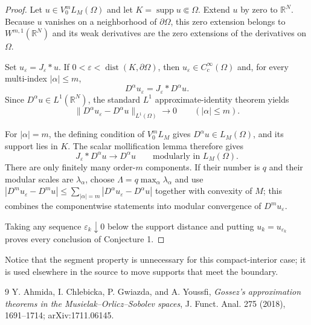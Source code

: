 \documentclass[11pt]{article}
\newcommand{\R}{\mathbb R}
\begin{document}
\begin{proof}
Let $u\in V_0^mL_M(\Omega)$ and let $K=\operatorname{supp}u\Subset\Omega$.
Extend $u$ by zero to $\R^N$.  Because $u$ vanishes on a neighborhood of
$\partial\Omega$, this zero extension belongs to $W^{m,1}(\R^N)$ and its weak
derivatives are the zero extensions of the derivatives on $\Omega$.

Set $u_\varepsilon=J_\varepsilon*u$.  If
$0<\varepsilon<\operatorname{dist}(K,\partial\Omega)$, then
$u_\varepsilon\in C_c^\infty(\Omega)$ and, for every multi-index
$|\alpha|\le m$,
\[
 D^\alpha u_\varepsilon=J_\varepsilon*D^\alpha u.
\]
Since $D^\alpha u\in L^1(\R^N)$, the standard $L^1$ approximate-identity
theorem yields
\[
 \|D^\alpha u_\varepsilon-D^\alpha u\|_{L^1(\Omega)}\longrightarrow0
 \qquad (|\alpha|\le m).
\]

For $|\alpha|=m$, the defining condition of $V_0^mL_M$ gives
$D^\alpha u\in L_M(\Omega)$, and its support lies in $K$.  The scalar
mollification lemma therefore gives
\[
 J_\varepsilon*D^\alpha u\longrightarrow D^\alpha u
 \qquad\text{modularly in }L_M(\Omega).
\]
There are only finitely many order-$m$ components.  If their number is $q$ and
their modular scales are $\lambda_\alpha$, choose
$\Lambda=q\max_\alpha\lambda_\alpha$ and use
$|D^m u_\varepsilon-D^m u|\leq\sum_{|\alpha|=m}
|D^\alpha u_\varepsilon-D^\alpha u|$ together with convexity of $M$; this
combines the componentwise statements into modular convergence of
$D^m u_\varepsilon$.

Taking any sequence $\varepsilon_k\downarrow0$ below the support distance and
putting $u_k=u_{\varepsilon_k}$ proves every conclusion of Conjecture 1.
\end{proof}

Notice that the segment property is unnecessary for this compact-interior
case; it is used elsewhere in the source to move supports that meet the
boundary.

\sloppy
\begin{thebibliography}{9}
Y. Ahmida, I. Chlebicka, P. Gwiazda, and A. Youssfi,
\emph{Gossez's approximation theorems in the Musielak--Orlicz--Sobolev
spaces}, J. Funct. Anal. 275 (2018), 1691--1714; arXiv:1711.06145.

\end{thebibliography}
\end{document}

